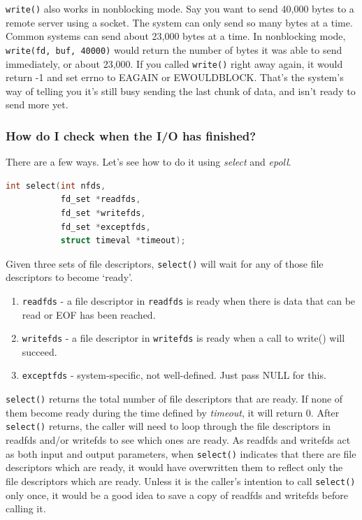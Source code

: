 \texttt{write()} also works in nonblocking mode. Say you want to send 40,000 bytes to a remote server using a socket. The system can only send so many bytes at a time. Common systems can send about 23,000 bytes at a time. In nonblocking mode, \texttt{write(fd, buf, 40000)} would return the number of bytes it was able to send immediately, or about 23,000. If you called \texttt{write()} right away again, it would return -1 and set errno to EAGAIN or EWOULDBLOCK. That's the system's way of telling you it's still busy sending the last chunk of data, and isn't ready to send more yet.

\subsubsection{How do I check when the I/O has finished?}\label{how-do-i-check-when-the-io-has-finished}

There are a few ways. Let's see how to do it using \emph{select} and \emph{epoll}.

\begin{lstlisting}[language=C]
int select(int nfds, 
           fd_set *readfds, 
           fd_set *writefds,
           fd_set *exceptfds, 
           struct timeval *timeout);
\end{lstlisting}

Given three sets of file descriptors, \texttt{select()} will wait for any of those file descriptors to become `ready'. 

\begin{enumerate}
\item \texttt{readfds} - a file descriptor in \texttt{readfds} is ready when there is data that can be read or EOF has been reached. 
\item \texttt{writefds} - a file descriptor in \texttt{writefds} is ready when a call to write() will succeed. 
\item \texttt{exceptfds} - system-specific, not well-defined. Just pass NULL for this.
\end{enumerate}

\texttt{select()} returns the total number of file descriptors that are ready. If none of them become ready during the time defined by \emph{timeout}, it will return 0. After \texttt{select()} returns, the caller will need to loop through the file descriptors in readfds and/or writefds to see which ones are ready. As readfds and writefds act as both input and output parameters, when \texttt{select()} indicates that there are file descriptors which are ready, it would have overwritten them to reflect only the file descriptors which are ready. Unless it is the caller's intention to call \texttt{select()} only once, it would be a good idea to save a copy of readfds and writefds before calling it.

